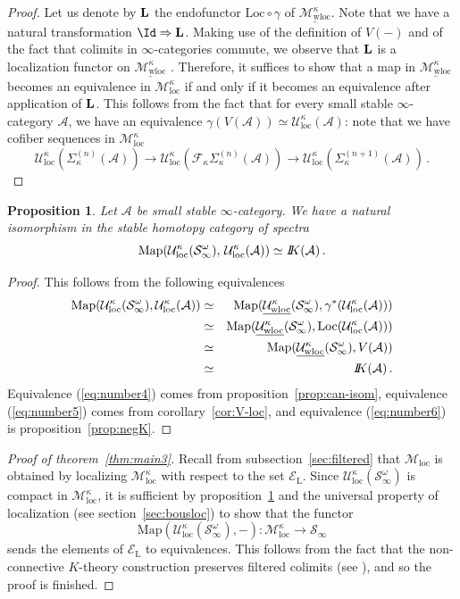 \documentclass{amsart}
\newcommand{\cA}{{\mathcal A}}
\newcommand{\cE}{{\mathcal E}}
\newcommand{\cF}{{\mathcal F}}
\newcommand{\cM}{{\mathcal M}}
\newcommand{\cU}{{\mathcal U}}
\let\catsymbfont\mathcal
\newcommand{\aS}{{\catsymbfont{S}}}
\renewcommand{\L}{\mathrm{L}}
\newcommand{\bbK}{I\mspace{-6.mu}K}
\newcommand{\Loc}{\mathrm{Loc}}%
\newcommand{\Map}{\mathrm{Map}}%
\newcommand{\ispec}{\aS_{\infty}}
\newcommand{\too}{\longrightarrow}%
\renewcommand{\i}{\infty}
\newcommand{\uwMotloc}{\underline{\cM_{\mathrm{wloc}}^\kappa}}
\newcommand{\wMotloc}{\cM_{\mathrm{loc}}^\kappa}
\newcommand{\Motloc}{\cM_\mathrm{loc}}
\newcommand{\uwUloc}{\underline{\cU_{\mathrm{wloc}}^\kappa}}
\newcommand{\wUloc}{\cU_{\mathrm{loc}}^\kappa}
\newcommand{\kcone}{\cF_{\kappa}}
\newcommand{\ksusp}{\Sigma_{\kappa}}
\numberwithin{equation}{section}
\newtheorem{proposition}[equation]{Proposition}
\theoremstyle{definition}
\begin{document}
\begin{proof}
Let us denote by ${\bf L}$ the endofunctor $\Loc \circ \gamma$ of
$\uwMotloc$.  Note that we have a natural transformation
$\Id \Rightarrow {\bf L}$. Making use of the definition of
$V(-)$ and of the fact that colimits in $\i$-categories commute, we
observe that ${\bf L}$ is a localization functor on
$\uwMotloc$ \cite[5.2.7.4]{HTT}. Therefore, it suffices 
to show that a map in $\uwMotloc$ becomes an equivalence in $\wMotloc$
if and only if it becomes an equivalence after application of ${\bf
L}$. This follows from the fact that for every small stable
$\i$-category $\cA$, we have an equivalence
$\gamma(V(\cA)) \simeq \wUloc(\cA)$: note that we have cofiber
sequences in $\wMotloc$ 
$$ \wUloc(\ksusp^{(n)}(\cA)) \too \wUloc(\kcone\ksusp^{(n)}(\cA)) \too \wUloc(\ksusp^{(n+1)}(\cA))  \,.$$ 
\end{proof}
\begin{proposition}\label{prop:negK1}
Let $\cA$ be small stable $\i$-category.  We have a natural
isomorphism in the stable homotopy category of spectra 
$$ \Map(\wUloc(\ispec^\omega),\, \wUloc(\cA)) \simeq \bbK(\cA)\,.$$
\end{proposition}
\begin{proof}
This follows from the following equivalences
\begin{eqnarray}
 \Map(\wUloc(\ispec^\omega), \wUloc(\cA)) & \simeq &  \Map(\uwUloc(\ispec^\omega), \gamma^{\ast}(\wUloc(\cA))) \nonumber \\
& \simeq & \Map(\uwUloc(\ispec^\omega), \mathrm{Loc}(\wUloc(\cA))) \label{eq:number4} \\
& \simeq & \Map(\uwUloc(\ispec^\omega), V(\cA)) \label{eq:number5}\\
& \simeq & \bbK(\cA)\label{eq:number6}\,.
\end{eqnarray}
Equivalence (\ref{eq:number4}) comes from proposition~\ref{prop:can-isom}, equivalence (\ref{eq:number5}) comes from corollary~\ref{cor:V-loc}, and equivalence (\ref{eq:number6}) is proposition~\ref{prop:negK}.
\end{proof}
\begin{proof}[Proof of theorem~\ref{thm:main3}]
Recall from subsection~\ref{sec:filtered} that $\Motloc$ is obtained
by localizing $\wMotloc$ with respect to the set $\cE_\L$. Since
$\wUloc(\ispec^\omega)$ is compact in $\wMotloc$, it is sufficient by
proposition~\ref{prop:negK1} and the universal property of
localization (see section~\ref{sec:bousloc}) to show that the functor
\[
\Map(\wUloc(\ispec^\omega),-)\colon \wMotloc \too \ispec
\]
sends the elements of $\cE_\L$ to equivalences. This follows from the
fact that the non-connective $K$-theory construction preserves
filtered colimits (see \cite[\S7, Lemma~6]{Marco}), and so the proof
is finished. 
\end{proof}
\end{document}
